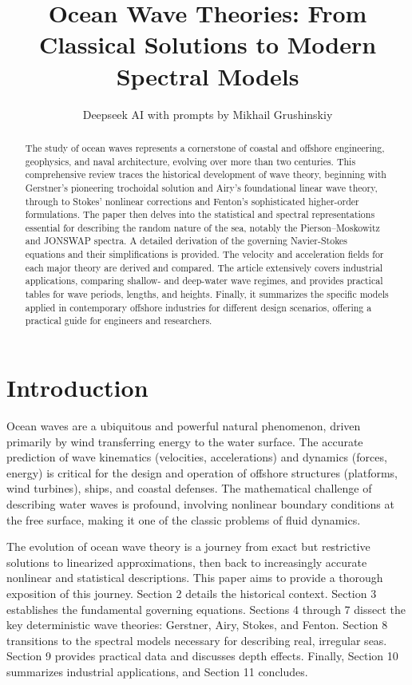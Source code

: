 \documentclass[11pt,a4paper]{article}
\title{Ocean Wave Theories: From Classical Solutions to Modern Spectral Models}
\author{Deepseek AI with prompts by Mikhail Grushinskiy}
\date{}
\begin{document}
\maketitle

\begin{abstract}
\noindent The study of ocean waves represents a cornerstone of coastal and offshore engineering, geophysics, and naval architecture, evolving over more than two centuries. This comprehensive review traces the historical development of wave theory, beginning with Gerstner's pioneering trochoidal solution and Airy's foundational linear wave theory, through to Stokes' nonlinear corrections and Fenton’s sophisticated higher-order formulations. The paper then delves into the statistical and spectral representations essential for describing the random nature of the sea, notably the Pierson–Moskowitz and JONSWAP spectra. A detailed derivation of the governing Navier-Stokes equations and their simplifications is provided. The velocity and acceleration fields for each major theory are derived and compared. The article extensively covers industrial applications, comparing shallow- and deep-water wave regimes, and provides practical tables for wave periods, lengths, and heights. Finally, it summarizes the specific models applied in contemporary offshore industries for different design scenarios, offering a practical guide for engineers and researchers.
\end{abstract}

\newpage
\tableofcontents
\newpage

\section{Introduction}
Ocean waves are a ubiquitous and powerful natural phenomenon, driven primarily by wind transferring energy to the water surface. The accurate prediction of wave kinematics (velocities, accelerations) and dynamics (forces, energy) is critical for the design and operation of offshore structures (platforms, wind turbines), ships, and coastal defenses. The mathematical challenge of describing water waves is profound, involving nonlinear boundary conditions at the free surface, making it one of the classic problems of fluid dynamics.

The evolution of ocean wave theory is a journey from exact but restrictive solutions to linearized approximations, then back to increasingly accurate nonlinear and statistical descriptions. This paper aims to provide a thorough exposition of this journey. Section 2 details the historical context. Section 3 establishes the fundamental governing equations. Sections 4 through 7 dissect the key deterministic wave theories: Gerstner, Airy, Stokes, and Fenton. Section 8 transitions to the spectral models necessary for describing real, irregular seas. Section 9 provides practical data and discusses depth effects. Finally, Section 10 summarizes industrial applications, and Section 11 concludes.
\end{document}
